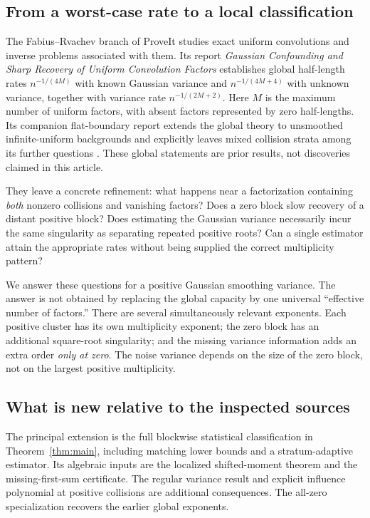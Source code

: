 \documentclass[11pt,a4paper]{article}
\numberwithin{equation}{section}
\theoremstyle{definition}
\theoremstyle{remark}
\begin{document}
\subsection{From a worst-case rate to a local classification}
The Fabius--Rvachev branch of ProveIt studies exact uniform convolutions and
inverse problems associated with them. Its report \emph{Gaussian Confounding
and Sharp Recovery of Uniform Convolution Factors} \cite{RepoGaussian}
establishes global half-length rates $n^{-1/(4M)}$ with known Gaussian variance
and $n^{-1/(4M+4)}$ with unknown variance, together with variance rate
$n^{-1/(2M+2)}$. Here $M$ is the maximum number of uniform factors, with absent
factors represented by zero half-lengths. Its companion flat-boundary report
extends the global theory to unsmoothed infinite-uniform backgrounds and
explicitly leaves mixed collision strata among its further questions
\cite{RepoFlat}. These global statements
are prior results, not discoveries claimed in this article.

They leave a concrete refinement: what happens near a factorization containing
\emph{both} nonzero collisions and vanishing factors? Does a zero block slow
recovery of a distant positive block? Does estimating the Gaussian variance
necessarily incur the same singularity as separating repeated positive roots?
Can a single estimator attain the appropriate rates without being supplied
the correct multiplicity pattern?

We answer these questions for a positive Gaussian smoothing variance. The
answer is not obtained by replacing the global capacity by one universal
``effective number of factors.'' There are several simultaneously relevant
exponents. Each positive cluster has its own multiplicity exponent; the zero
block has an additional square-root singularity; and the missing variance
information adds an extra order \emph{only at zero}. The noise variance depends
on the size of the zero block, not on the largest positive multiplicity.

\subsection{What is new relative to the inspected sources}
The principal extension is the full blockwise statistical classification in
Theorem~\ref{thm:main}, including matching lower bounds and a stratum-adaptive
estimator. Its algebraic inputs are the localized shifted-moment theorem and
the missing-first-sum certificate. The regular variance result and explicit
influence polynomial at positive collisions are additional consequences.
The all-zero specialization recovers the earlier global exponents.
\end{document}
